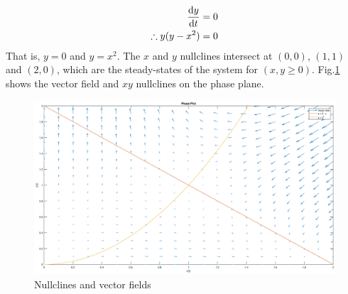 \documentclass[12pt,1in]{article}
\newenvironment{Example}[2][Example]{\begin{trivlist}
		\item[\hskip \labelsep {\bfseries #1}\hskip \labelsep {\bfseries #2.}]}{\end{trivlist}}
\begin{document}
\begin{Example}{2}
\begin{align*}
	\derivative{y}{t} &= 0\\
	\therefore y(y - x^2 ) &= 0
	\end{align*}
	That is, $y = 0$ and $y = x^2$. The $x$ and $y$ nullclines intersect at $(0,0)$, $(1,1)$ and $(2,0)$, which are the steady-states of the system for $(x,y \ge 0)$. Fig.\ref{fig:example2} shows the vector field and $xy$ nullclines on the phase plane. 
\begin{figure}[H]
	\centering
	\includegraphics[trim={2in 0 2in 0},width=\linewidth]{Figures/example_2}
	\caption{Nullclines and vector fields}
	\label{fig:example2}
\end{figure}
\end{Example}
\end{document}
